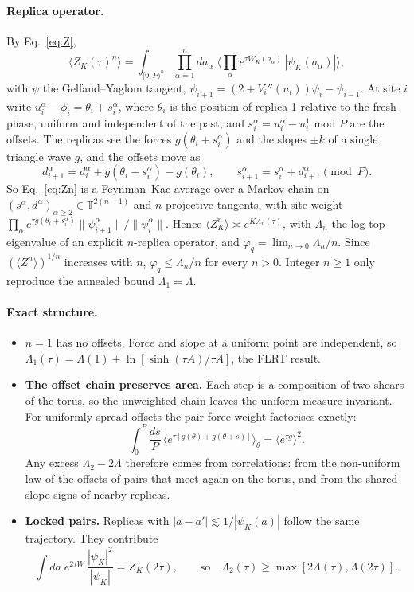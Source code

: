 \documentclass[10pt,a4paper]{article}
\begin{document}
\paragraph{Replica operator.}
By Eq.~\eqref{eq:Z},
\begin{equation}
\langle Z_K(\tau)^n\rangle=\int_{[0,P)^n}\prod_{\alpha=1}^n da_\alpha\;\Big\langle\prod_\alpha e^{\tau W_K(a_\alpha)}\,|\psi_K(a_\alpha)|\Big\rangle ,
\label{eq:Zn}
\end{equation}
with $\psi$ the Gelfand--Yaglom tangent, $\psi_{i+1}=(2+V_i''(u_i))\psi_i-\psi_{i-1}$.
At site $i$ write $u^\alpha_i-\phi_i=\theta_i+s^\alpha_i$, where $\theta_i$ is the position of replica 1 relative to the fresh phase, uniform and independent of the past, and $s^\alpha_i=u^\alpha_i-u^1_i$ mod $P$ are the offsets.
The replicas see the forces $g(\theta_i+s^\alpha_i)$ and the slopes $\pm k$ of a single triangle wave $g$, and the offsets move as
\begin{equation}
d^\alpha_{i+1}=d^\alpha_i+g(\theta_i+s^\alpha_i)-g(\theta_i),\qquad s^\alpha_{i+1}=s^\alpha_i+d^\alpha_{i+1}\pmod P .
\end{equation}
So Eq.~\eqref{eq:Zn} is a Feynman--Kac average over a Markov chain on $(s^\alpha,d^\alpha)_{\alpha\ge2}\in\mathbb T^{2(n-1)}$ and $n$ projective tangents, with site weight $\prod_\alpha e^{\tau g(\theta_i+s^\alpha_i)}\|\psi^\alpha_{i+1}\|/\|\psi^\alpha_i\|$.
Hence $\langle Z_K^n\rangle\asymp e^{K\Lambda_n(\tau)}$, with $\Lambda_n$ the log top eigenvalue of an explicit $n$-replica operator, and $\varphi_q=\lim_{n\to0}\Lambda_n/n$.
Since $(\langle Z^n\rangle)^{1/n}$ increases with $n$, $\varphi_q\le\Lambda_n/n$ for every $n>0$. Integer $n\ge1$ only reproduce the annealed bound $\Lambda_1=\Lambda$.

\paragraph{Exact structure.}
\begin{itemize}
\item \textbf{$n=1$} has no offsets. Force and slope at a uniform point are independent, so $\Lambda_1(\tau)=\Lambda(1)+\ln[\sinh(\tau A)/\tau A]$, the FLRT result.
\item \textbf{The offset chain preserves area.} Each step is a composition of two shears of the torus, so the unweighted chain leaves the uniform measure invariant. For uniformly spread offsets the pair force weight factorises exactly:
\[\int_0^P\frac{ds}{P}\,\big\langle e^{\tau[g(\theta)+g(\theta+s)]}\big\rangle_\theta=\langle e^{\tau g}\rangle^2 .\]
 Any excess $\Lambda_2-2\Lambda$ therefore comes from correlations: from the non-uniform law of the offsets of pairs that meet again on the torus, and from the shared slope signs of nearby replicas.
\item \textbf{Locked pairs.} Replicas with $|a-a'|\lesssim1/|\psi_K(a)|$ follow the same trajectory. They contribute
\[\int da\;e^{2\tau W}\,\frac{|\psi_K|^2}{|\psi_K|}=Z_K(2\tau),\qquad\text{so}\quad \Lambda_2(\tau)\ge\max[2\Lambda(\tau),\Lambda(2\tau)].\]
\end{itemize}
\end{document}
